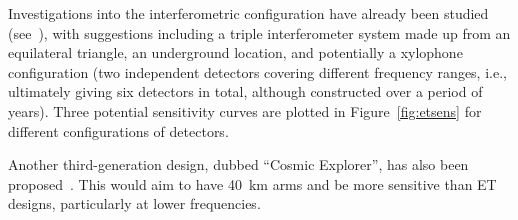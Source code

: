 Investigations into the interferometric configuration have already been studied
(see~\cite{Freise:2008, Hild:2008, Hild:2010}), with suggestions including a
triple interferometer system made up from an equilateral triangle, an
underground location, and potentially a xylophone configuration (two independent
detectors covering different frequency ranges, i.e., ultimately giving six
detectors in total, although constructed over a period of years). Three
potential sensitivity curves are plotted in Figure~\ref{fig:etsens} for different
configurations of detectors.

Another third-generation design, dubbed ``Cosmic Explorer'', has also been proposed~\cite{2016arXiv160708697A, 2015PhRvD..91h2001D}.
This would aim to have 40~km arms and be more sensitive than ET designs, particularly at lower
frequencies.